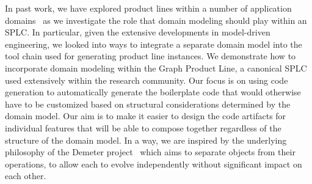 In past work, we have explored product lines within a number of
application domains~\cite{Heineman:2015:TMO:2791060.2791076,PEPM18} as
we investigate the role that domain modeling should play within an SPLC.
In particular, given the extensive developments in model-driven
engineering, we looked into ways to integrate a separate domain model
into the tool chain used for generating product line instances. We
demonstrate how to incorporate domain modeling within the Graph Product
Line, a canonical SPLC used extensively within the research community.
Our focus is on using code generation to automatically generate the
boilerplate code that would otherwise have to be customized
based on structural considerations determined by the domain model. Our aim is to 
make it easier to design the code artifacts for individual features that 
will be able to compose together regardless of the structure of the domain
model. In a way, we are inspired by the underlying philosophy of the Demeter
project~\cite{karl:demeter} which aims to separate objects from their operations, to allow
each to evolve independently without significant impact on each other.

%
%
%
%
%






